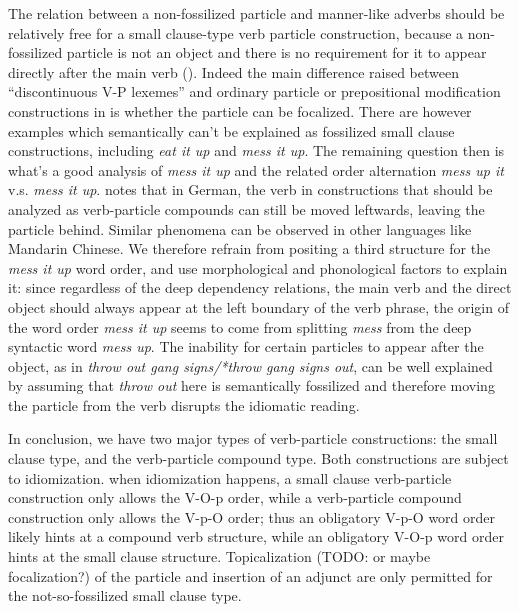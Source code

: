 \documentclass[UTF8, a4paper, oneside, scheme=plain, 12pt]{ctexbook}
\newcommand*{\citepage}[1]{p.~{#1}}
\newcommand{\form}[1]{\emph{#1}}
\begin{document}
The relation between a non-fossilized particle and manner-like adverbs 
should be relatively free for a small clause-type verb particle construction, 
because a non-fossilized particle is not an object 
and there is no requirement for it to appear directly after the main verb 
().
Indeed the main difference raised between ``discontinuous V-P lexemes'' 
and ordinary particle or prepositional modification constructions in \citet{farrell2005english}
is whether the particle can be focalized.
There are however examples which semantically can't be explained as fossilized small clause constructions,
including \form{eat it up} and \form{mess it up}.
The remaining question then is what's a good analysis of \form{mess it up}
and the related order alternation \form{mess up it} v.s. \form{mess it up}.
\citet{wurmbrand2000structure} notes that in German, 
the verb in constructions that should be analyzed as verb-particle compounds 
can still be moved leftwards, leaving the particle behind.
Similar phenomena can be observed in other languages like Mandarin Chinese.
We therefore refrain from positing a third structure for the \form{mess it up} word order, 
and use morphological and phonological factors to explain it:
since regardless of the deep dependency relations, 
the main verb and the direct object should always appear at the left boundary of the verb phrase, 
the origin of the word order \form{mess it up} seems to come from
splitting \form{mess} from the deep syntactic word \form{mess up}.
The inability for certain particles to appear after the object, 
as in \form{throw out gang signs/*throw gang signs out}, 
can be well explained by assuming that \form{throw out} here is semantically fossilized 
and therefore moving the particle from the verb disrupts the idiomatic reading.

In conclusion, we have two major types of verb-particle constructions: 
the small clause type, and the verb-particle compound type.
Both constructions are subject to idiomization.
when idiomization happens, a small clause verb-particle construction only allows the V-O-p order, 
while a verb-particle compound construction only allows the V-p-O order; 
thus an obligatory V-p-O word order likely hints at a compound verb structure, 
while an obligatory V-O-p word order hints at the small clause structure. 
Topicalization (TODO: or maybe focalization?) of the particle 
and insertion of an adjunct \citep[\citepage{285}]{cgel}
are only permitted for the not-so-fossilized small clause type.
\end{document}
